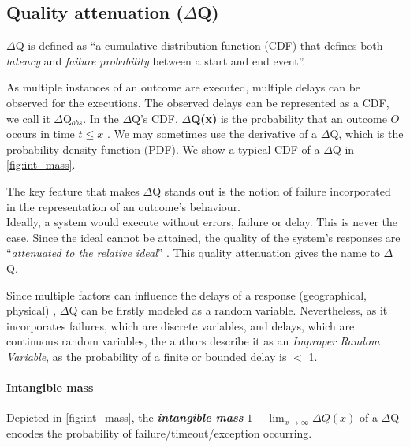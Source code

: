 \subsection{Quality attenuation ($\Delta$Q)}
    $\Delta$Q is defined as ``a cumulative distribution function (CDF) that defines both \textit{latency} and \textit{failure probability} between a start and end event''. \cite{dq-tut}
    
        As multiple instances of an outcome are executed, multiple delays can be observed for the executions. The observed delays can be represented as a CDF, we call it $\Delta$Q$_{obs}$. In the $\Delta$Q's CDF, \textbf{$\Delta$Q(x)} is the probability that an outcome $O$ occurs in time $t \le x$ \cite{art}.  We may sometimes use the derivative of a $\Delta$Q, which is the probability density function (PDF). We show a typical CDF of a $\Delta$Q in \cref{fig:int_mass}.

    The key feature that makes $\Delta$Q stands out is the notion of failure incorporated in the representation of an outcome's behaviour. \\
 Ideally, a system would execute without errors, failure or delay. This is never the case. Since the ideal cannot be attained, the quality of the system's responses are ``\textit{attenuated to the relative ideal}''  \cite{myo}. This quality attenuation gives the name to $\Delta$Q.

    Since multiple factors can influence the delays of a response (geographical, physical) \cite{dq-tut}, $\Delta$Q can be firstly modeled as a random variable. Nevertheless, as it incorporates failures, which are discrete variables, and delays, which are continuous random variables, the authors describe it as an \textit{Improper Random Variable}, as the probability of a finite or bounded delay is $<$ 1. \cite{myo}
   
    \paragraph{Intangible mass} Depicted in \cref{fig:int_mass}, the \textbf{\textit{intangible mass}} $1 - \lim_{x\to\infty}\Delta Q(x)$ of a $\Delta$Q encodes the probability of failure/timeout/exception occurring. \cite{art}\label{int_mass}
        
